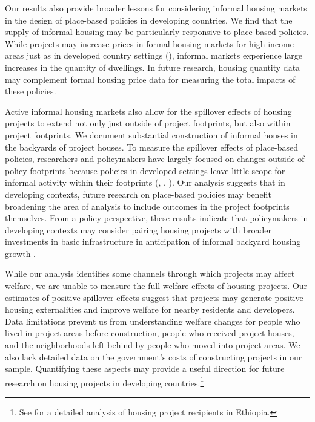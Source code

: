 \documentclass[12pt]{article}
\newcommand{\rv}{}
\begin{document}
Our results also provide broader lessons for considering informal housing markets in the design of place-based policies in developing countries.  We find that the supply of informal housing may be particularly responsive to place-based policies.  While projects may increase prices in formal housing markets for high-income areas just as in developed country settings (\cite{diamond2019wants}), informal markets experience large increases in the quantity of dwellings.  In future research, housing quantity data may complement formal housing price data for measuring the total impacts of these policies.  

Active informal housing markets also allow for the spillover effects of housing projects to extend not only just outside of project footprints, but also within project footprints.  We document substantial construction of informal houses in the backyards of project houses.  \rv{To measure the spillover effects of place-based policies, researchers and policymakers have largely focused on changes outside of policy footprints because policies in developed settings leave little scope for informal activity within their footprints (\cite{diamond2019wants}, \cite{rossi2010housing}, \cite{hornbeck2017creative}).  Our analysis suggests that in developing contexts, future research on place-based policies may benefit broadening the area of analysis to include outcomes in the project footprints themselves.}  From a policy perspective, these results indicate that policymakers in developing contexts may consider pairing housing projects with broader investments in basic infrastructure in anticipation of informal backyard housing growth \citep{visagie2020getting}.

\rv{While our analysis identifies some channels through which projects may affect welfare, we are unable to measure the full welfare effects of housing projects.  Our estimates of positive spillover effects suggest that projects may generate positive housing externalities and improve welfare for nearby residents and developers.  Data limitations prevent us from understanding welfare changes for people who lived in project areas before construction, people who received project houses, and the neighborhoods left behind by people who moved into project areas.  We also lack detailed data on the government's costs of constructing projects in our sample.  Quantifying these aspects may provide a useful direction for future research on housing projects in developing countries.}\footnote{ \rv{See \cite{franklin2019demand} for a detailed analysis of housing project recipients in Ethiopia.} }
\end{document}
